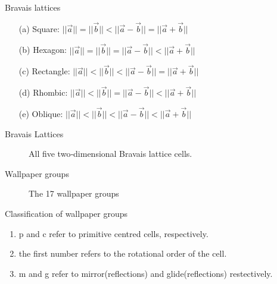 \documentclass{beamer}
\begin{document}
\begin{frame}{Bravais lattices}
    \begin{enumerate}
        \item[(a)] Square:\hspace*{14pt} $||\vec{a}||=||\vec{b}|| < ||\vec{a}-\vec{b}|| = ||\vec{a}+\vec{b}||$

        \item[(b)] Hexagon:\hspace*{6pt} $||\vec{a}||=||\vec{b}|| = ||\vec{a}-\vec{b}|| < ||\vec{a}+\vec{b}||$

        \item[(c)] Rectangle: $||\vec{a}||<||\vec{b}|| < ||\vec{a}-\vec{b}|| = ||\vec{a}+\vec{b}||$

        \item[(d)] Rhombic:\hspace*{6pt} $||\vec{a}||<||\vec{b}|| = ||\vec{a}-\vec{b}|| < ||\vec{a}+\vec{b}||$

        \item[(e)] Oblique:\hspace*{11pt} $||\vec{a}||<||\vec{b}|| < ||\vec{a}-\vec{b}|| < ||\vec{a}+\vec{b}||$
    \end{enumerate}
\end{frame}

\begin{frame}{Bravais Lattices}
    \begin{figure}
        \centering
        
        \caption{All five two‐dimensional Bravais lattice cells.}
        \label{fig:bravis-lattices}
    \end{figure}
\end{frame}



\begin{frame}{Wallpaper groups}
    \begin{figure}
        \centering
        
        \caption{The 17 wallpaper groups \cite{}}
        \label{fig:17WallpaperGroups}
    \end{figure}
\end{frame}

\begin{frame}{Classification of wallpaper groups}
    \begin{enumerate}
        \item p and c refer to primitive centred cells, respectively.
        \item the first number refers to the rotational order of the cell. 
        \item m and g refer to mirror(reflections) and glide(reflections) restectively. 
    \end{enumerate}
\end{frame}
\end{document}
